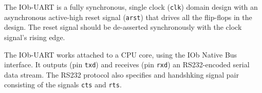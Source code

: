 The IOb-UART is a fully synchronous, single clock ({\tt clk}) domain
design with an asynchronous active-high reset signal ({\tt arst}) that drives
all the flip-flops in the design. The reset signal should be de-asserted
synchronously with the clock signal's rising edge.

The IOb-UART works attached to a CPU core, using the IOb Native Bus
interface. It outputs (pin {\tt txd}) and receives (pin {\tt rxd}) an
RS232-encoded serial data stream. The RS232 protocol also specifies and
handshking signal pair consisting of the signals {\tt cts} and {\tt rts}.

